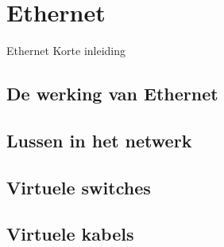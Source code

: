 \section{Ethernet}
\label{sec:ethernet}

\begin{frame}{Ethernet}
    Korte inleiding
\end{frame}

\subsection{De werking van Ethernet}

\begin{frame}
\end{frame}

\subsection{Lussen in het netwerk}

\begin{frame}
\end{frame}

\subsection{Virtuele switches}

\begin{frame}
\end{frame}

\subsection{Virtuele kabels}

\begin{frame}
\end{frame}

